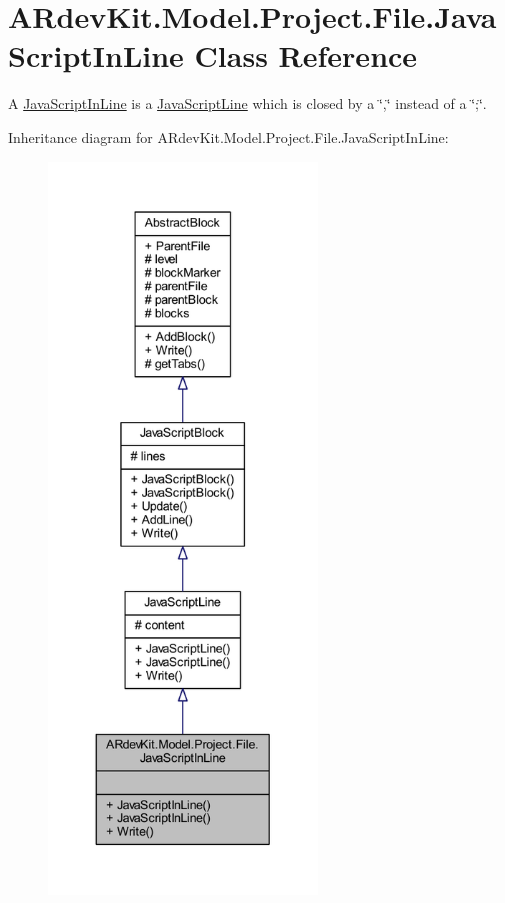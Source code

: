 \hypertarget{class_a_rdev_kit_1_1_model_1_1_project_1_1_file_1_1_java_script_in_line}{\section{A\-Rdev\-Kit.\-Model.\-Project.\-File.\-Java\-Script\-In\-Line Class Reference}
\label{class_a_rdev_kit_1_1_model_1_1_project_1_1_file_1_1_java_script_in_line}
}


A \hyperlink{class_a_rdev_kit_1_1_model_1_1_project_1_1_file_1_1_java_script_in_line}{Java\-Script\-In\-Line} is a \hyperlink{class_a_rdev_kit_1_1_model_1_1_project_1_1_file_1_1_java_script_line}{Java\-Script\-Line} which is closed by a \char`\"{},\char`\"{} instead of a \char`\"{};\char`\"{}.  




Inheritance diagram for A\-Rdev\-Kit.\-Model.\-Project.\-File.\-Java\-Script\-In\-Line\-:
\nopagebreak
\begin{figure}[H]
\begin{center}
\leavevmode
\includegraphics[height=550pt]{class_a_rdev_kit_1_1_model_1_1_project_1_1_file_1_1_java_script_in_line__inherit__graph}
\end{center}
\end{figure}


